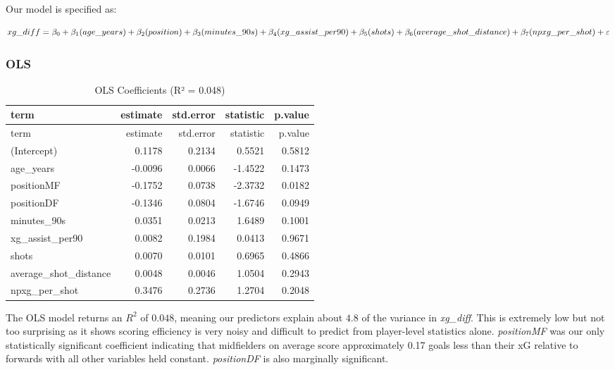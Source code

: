 \documentclass[
  letterpaper,
  DIV=11,
  numbers=noendperiod]{scrartcl}
\begin{document}
Our model is specified as:

\[xg\_diff = \beta_0 + \beta_1(age\_years) + \beta_2(position) + \beta_3(minutes\_90s) + \\\beta_4(xg\_assist\_per90) + \beta_5(shots) + \beta_6(average\_shot\_distance) + \\\beta_7(npxg\_per\_shot) + \varepsilon\]

\subsubsection{OLS}\label{ols}

\begin{longtable}[]{@{}lrrrr@{}}
\caption{OLS Coefficients (R² = 0.048)}\tabularnewline
\toprule\noalign{}
term & estimate & std.error & statistic & p.value \\
\midrule\noalign{}
\endfirsthead
\toprule\noalign{}
term & estimate & std.error & statistic & p.value \\
\midrule\noalign{}
\endhead
\bottomrule\noalign{}
\endlastfoot
(Intercept) & 0.1178 & 0.2134 & 0.5521 & 0.5812 \\
age\_years & -0.0096 & 0.0066 & -1.4522 & 0.1473 \\
positionMF & -0.1752 & 0.0738 & -2.3732 & 0.0182 \\
positionDF & -0.1346 & 0.0804 & -1.6746 & 0.0949 \\
minutes\_90s & 0.0351 & 0.0213 & 1.6489 & 0.1001 \\
xg\_assist\_per90 & 0.0082 & 0.1984 & 0.0413 & 0.9671 \\
shots & 0.0070 & 0.0101 & 0.6965 & 0.4866 \\
average\_shot\_distance & 0.0048 & 0.0046 & 1.0504 & 0.2943 \\
npxg\_per\_shot & 0.3476 & 0.2736 & 1.2704 & 0.2048 \\
\end{longtable}

The OLS model returns an \(R^2\) of \(0.048\), meaning our predictors
explain about \(4.8%
\) of the variance in \emph{xg\_diff}. This is extremely low but not too
surprising as it shows scoring efficiency is very noisy and difficult to
predict from player-level statistics alone. \emph{positionMF} was our
only statistically significant coefficient indicating that midfielders
on average score approximately 0.17 goals less than their xG relative to
forwards with all other variables held constant. \emph{positionDF} is
also marginally significant.
\end{document}
